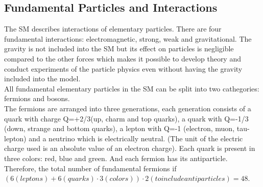 \subsection{Fundamental Particles and Interactions}
\label{sec:Intro_FundParticles}



The SM describes interactions of elementary particles. There are four fundamental interactions: electromagnetic, strong, weak and gravitational. The gravity is not included into the SM but its effect on particles is negligible compared to the other forces which makes it possible to develop theory and conduct experiments of the particle physics even without having the gravity included into the model.\\ 

All fundamental elementary particles in the SM can be split into two cathegories: fermions and bosons. \\

The fermions are arranged into three generations, each generation consists of a quark with charge Q=+2/3(up, charm and top quarks), a quark with Q=-1/3 (down, strange and bottom quarks), a lepton with Q=-1 (electron, muon, tau-lepton) and a neutrino which is electrically neutral. (The unit of the electric charge used is an absolute value of an electron charge). Each quark is present in three colors: red, blue and green. And each fermion has its antiparticle. Therefore, the total number of fundamental fermions if $(6 (leptons)+6 (quarks) \cdot 3 (colors) ) \cdot 2 (to include antiparticles) = 48$.\\ 

